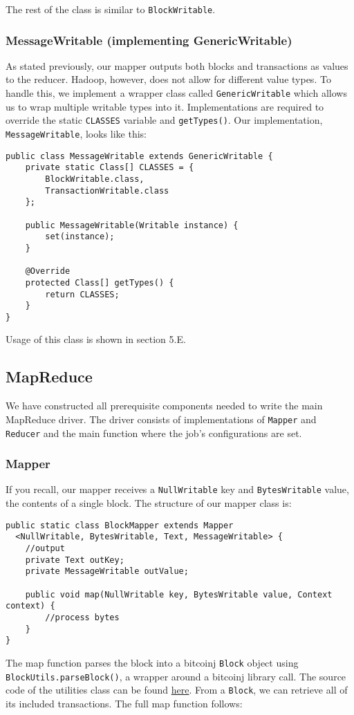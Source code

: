 \documentclass[9pt,twocolumn,twoside]{idsi}
\begin{document}
The rest of the class is similar to \lstinline{BlockWritable}.

\subsubsection{MessageWritable (implementing GenericWritable)}

As stated previously, our mapper outputs both blocks and transactions as values to the reducer. Hadoop, however, does not allow for different value types. To handle this, we implement a wrapper class called \lstinline{GenericWritable} which allows us to wrap multiple writable types into it. Implementations are required to override the static \lstinline{CLASSES} variable and \lstinline{getTypes()}. Our implementation, \lstinline{MessageWritable}, looks like this:

\begin{lstlisting}
public class MessageWritable extends GenericWritable {
    private static Class[] CLASSES = {
        BlockWritable.class,
        TransactionWritable.class
    };

    public MessageWritable(Writable instance) {
        set(instance);
    }

    @Override
    protected Class[] getTypes() {
        return CLASSES;
    }
}
\end{lstlisting}

Usage of this class is shown in section 5.E.

\subsection{MapReduce}
We have constructed all prerequisite components needed to write the main MapReduce driver. The driver consists of implementations of \lstinline{Mapper} and \lstinline{Reducer} and the main function where the job's configurations are set.

\subsubsection{Mapper}
If you recall, our mapper receives a \lstinline{NullWritable} key and \lstinline{BytesWritable} value, the contents of a single block. The structure of our mapper class is:
\begin{lstlisting}
public static class BlockMapper extends Mapper
  <NullWritable, BytesWritable, Text, MessageWritable> {
    //output
    private Text outKey;
    private MessageWritable outValue;

    public void map(NullWritable key, BytesWritable value, Context context) {
        //process bytes
    }
}
\end{lstlisting}
The map function parses the block into a bitcoinj \lstinline{Block} object using \lstinline{BlockUtils.parseBlock()}, a wrapper around a bitcoinj library call. The source code of the utilities class can be found \href{https://github.com/nishilshah17/idsi_bitcoin/blob/97859e4f8284f2fc5c1db488d61d075af9ea256d/reduce_blockchain/blockparser/BlockUtils.java}{here}. From a \lstinline{Block}, we can retrieve all of its included transactions. The full map function follows:
\end{document}
